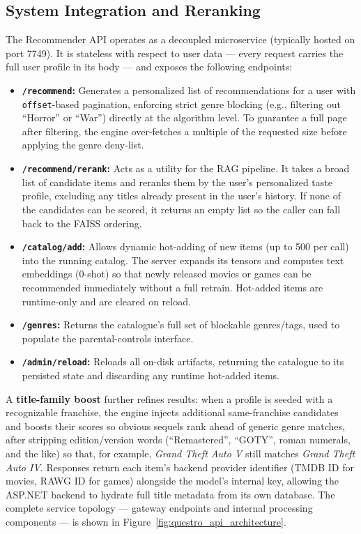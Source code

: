 \subsection{System Integration and Reranking}
The Recommender API operates as a decoupled microservice (typically hosted on port 7749). It is stateless with respect to user data --- every request carries the full user profile in its body --- and exposes the following endpoints:
\begin{itemize}
    \item \textbf{\texttt{/recommend}:} Generates a personalized list of recommendations for a user with \texttt{offset}-based pagination, enforcing strict genre blocking (e.g., filtering out ``Horror'' or ``War'') directly at the algorithm level. To guarantee a full page after filtering, the engine over-fetches a multiple of the requested size before applying the genre deny-list.
    \item \textbf{\texttt{/recommend/rerank}:} Acts as a utility for the RAG pipeline. It takes a broad list of candidate items and reranks them by the user's personalized taste profile, excluding any titles already present in the user's history. If none of the candidates can be scored, it returns an empty list so the caller can fall back to the FAISS ordering.
    \item \textbf{\texttt{/catalog/add}:} Allows dynamic hot-adding of new items (up to 500 per call) into the running catalog. The server expands its tensors and computes text embeddings (0-shot) so that newly released movies or games can be recommended immediately without a full retrain. Hot-added items are runtime-only and are cleared on reload.
    \item \textbf{\texttt{/genres}:} Returns the catalogue's full set of blockable genres/tags, used to populate the parental-controls interface.
    \item \textbf{\texttt{/admin/reload}:} Reloads all on-disk artifacts, returning the catalogue to its persisted state and discarding any runtime hot-added items.
\end{itemize}
A \textbf{title-family boost} further refines results: when a profile is seeded with a recognizable franchise, the engine injects additional same-franchise candidates and boosts their scores so obvious sequels rank ahead of generic genre matches, after stripping edition/version words (``Remastered'', ``GOTY'', roman numerals, and the like) so that, for example, \textit{Grand Theft Auto V} still matches \textit{Grand Theft Auto IV}. Responses return each item's backend provider identifier (TMDB ID for movies, RAWG ID for games) alongside the model's internal key, allowing the ASP.NET backend to hydrate full title metadata from its own database. The complete service topology --- gateway endpoints and internal processing components --- is shown in Figure~\ref{fig:questro_api_architecture}.


